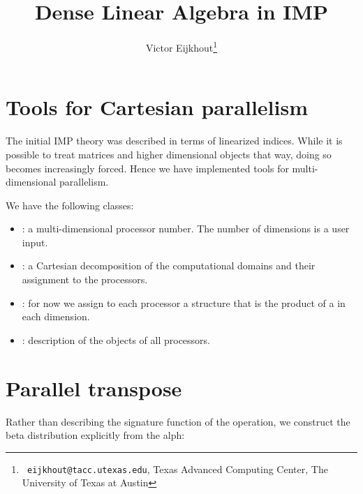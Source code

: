 \documentclass[11pt,fleqn,preprint]{impreport}
\title[Dense linear algebra]{Dense Linear Algebra in IMP}
\author[Eijkhout]{Victor Eijkhout\thanks{{\tt
      eijkhout@tacc.utexas.edu}, Texas Advanced Computing
    Center, The University of Texas at Austin}}
\begin{document}
\maketitle

\begin{abstract}
  
\end{abstract}

\acresetall

\section{Tools for Cartesian parallelism}

The initial \ac{IMP} theory was described in terms of linearized
indices. While it is possible to treat matrices and higher dimensional
objects that way, doing so becomes increasingly forced. Hence we have
implemented tools for multi-dimensional parallelism.

We have the following classes:
\begin{itemize}
\item {}: a multi-dimensional processor
  number. The number of dimensions is a user input.
\item {}: a Cartesian decomposition of the
  computational domains and their assignment to the processors.
\item {}: for now we assign to each processor a
  structure that is the product of a  in each
  dimension.
\item {}: description of the 
  objects of all processors.
\end{itemize}

\section{Parallel transpose}

Rather than describing the signature function of the operation,
we construct the beta distribution explicitly from the alph:



\end{document}

